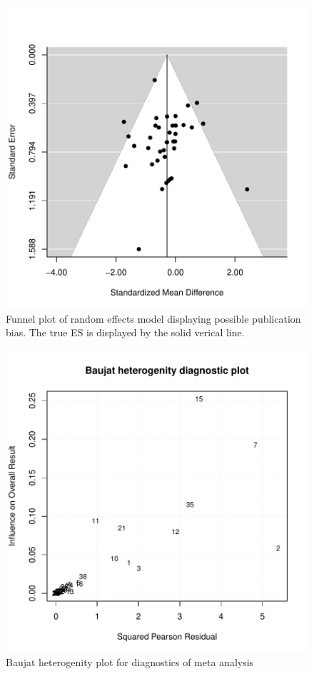\documentclass[11pt, a4paper]{article} %
\begin{document}
\begin{figure}
\captionsetup{width=0.6\textwidth}
\centering
\includegraphics{sweave_document_TB-funnelplot}
\caption{Funnel plot of random effects model displaying possible publication bias. The true ES is displayed by the solid verical line.}
\end{figure}

\begin{figure}
\captionsetup{width=0.6\textwidth}
\centering
\includegraphics{sweave_document_TB-baujat}
\caption{Baujat heterogenity plot for diagnostics of meta analysis}
\end{figure}
\end{document}
